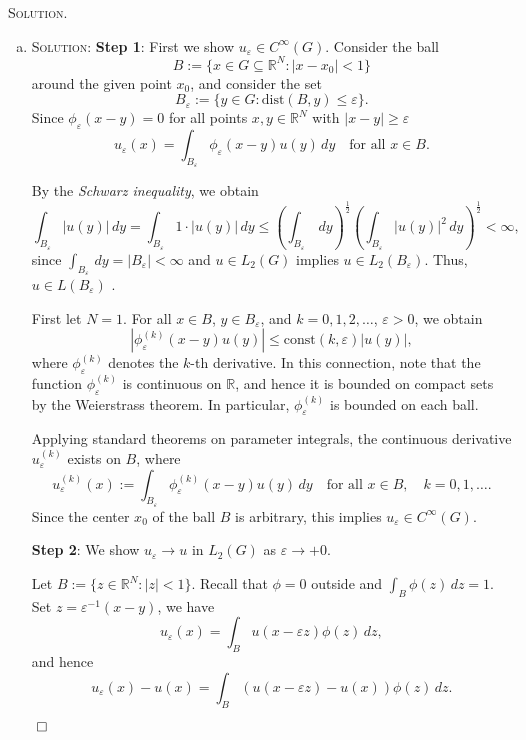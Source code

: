 \documentclass[12pt, a4paper, oneside]{ctexart}
\newenvironment{solution}{%
	\par\noindent\textsc{Solution. }\ignorespaces
}{%
	\hfill$\qed$\par
}
\begin{document}
	\begin{solution}
		\begin{enumerate}[(a)]
			\item \textsc{Solution:} \textbf{Step 1}: First we show $u_{\varepsilon}\in C^{\infty}(G)$. Consider the ball
			\[
			B := \{x \in G\subseteq\mathbb{R}^N : |x - x_0| < 1\}
			\]
			around the given point \( x_0 \), and consider the set
			\[
			B_\varepsilon := \{y \in G : \text{dist}(B, y) \leq \varepsilon\}.
			\]
			Since \( \phi_\varepsilon(x - y) = 0 \) for all points \( x, y \in \mathbb{R}^N \) with \( |x - y| \geq \varepsilon \)
			\[
			u_\varepsilon(x) = \int_{B_\varepsilon} \phi_\varepsilon(x - y) u(y) \, dy \quad \text{for all } x \in B.
			\]
			
			By the \textit{Schwarz inequality}, we obtain
			\[
			\int_{B_\varepsilon} |u(y)| \, dy = \int_{B_\varepsilon} 1 \cdot |u(y)| \, dy \leq \left( \int_{B_\varepsilon} \, dy \right)^{\frac{1}{2}} \left( \int_{B_\varepsilon} |u(y)|^2 \, dy \right)^{\frac{1}{2}} < \infty,
			\]
			since \( \int_{B_\varepsilon} \, dy = |B_\varepsilon| < \infty \) and \( u \in L_2(G) \) implies \( u \in L_{2}(B_\varepsilon) \). Thus, $u\in L(B_\varepsilon)$ .
			
			First let \( N = 1 \). For all \( x \in B \), \( y \in B_\varepsilon \), and \( k = 0, 1, 2, \ldots \), \( \varepsilon > 0 \), we obtain
			\[
			\left| \phi_\varepsilon^{(k)}(x - y) u(y) \right| \leq \text{const}(k, \varepsilon) |u(y)|, \tag{114}
			\]
			where \( \phi_\varepsilon^{(k)} \) denotes the \( k \)-th derivative. In this connection, note that the function \( \phi_\varepsilon^{(k)} \) is continuous on \( \mathbb{R} \), and hence it is bounded on compact sets by the Weierstrass theorem. In particular, \( \phi_\varepsilon^{(k)} \) is bounded on each ball.
			
			Applying standard theorems on parameter integrals, the continuous derivative \( u_\varepsilon^{(k)} \) exists on \( B \), where
			\[
			u_\varepsilon^{(k)}(x) := \int_{B_\varepsilon} \phi_\varepsilon^{(k)}(x - y) u(y) \, dy \quad \text{for all } x \in B, \quad k = 0, 1, \ldots.
			\]Since the center $x_{0}$ of the ball $B$ is arbitrary, this implies $u_{\varepsilon}\in C^{\infty}(G)$.
			
			\textbf{Step 2}: We show $u_{\varepsilon}\to u$ in $L_{2}(G)$ as $\varepsilon\to+0$. 
			
			Let \( B := \{z \in \mathbb{R}^N : |z| < 1\} \). Recall that \( \phi = 0 \) outside and \( \int_B \phi(z) \, dz = 1 \). Set $z = \varepsilon^{-1}(x-y)$, we have
			\[
			u_\varepsilon(x) = \int_B u(x - \varepsilon z) \phi(z) \, dz,
			\]
			and hence
			\[
			u_\varepsilon(x) - u(x) = \int_B (u(x - \varepsilon z) - u(x)) \phi(z) \, dz.
			\]
			

\end{enumerate}
\end{solution}
\end{document}
